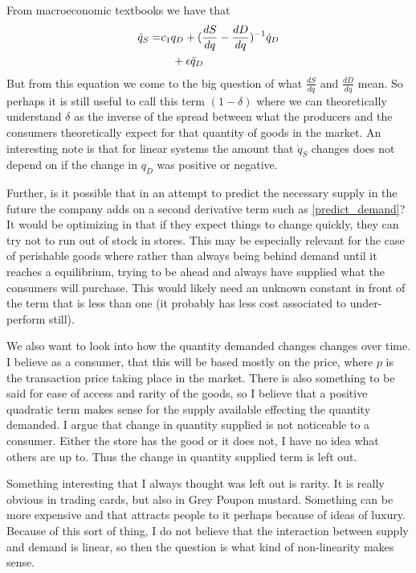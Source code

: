 \documentclass{article}
\begin{document}
From macroeconomic textbooks we have that 
\begin{align}
	\dot{q}_S = &  c_1 q_D + (\frac{dS}{dq} - \frac{dD}{dq})^{-1}\dot{q}_D \\
	& \ \ \ +\eps\ddot{q}_D %
\end{align}
But from this equation we come to the big question of what $\frac{dS}{dq}$ and $\frac{dD}{dq}$ mean. So perhaps it is still useful to call this term $(1-\delta)$ where we can theoretically understand $\delta$ as the inverse of the spread between what the producers and the consumers theoretically expect for that quantity of goods in the market. An interesting note is that for linear systems the amount that $\dot{q}_S$ changes does not depend on if the change in $q_D$ was positive or negative.

Further, is it possible that in an attempt to predict the necessary supply in the future the company adds on a second derivative term such as \eqref{predict_demand}? 
It would be optimizing in that if they expect things to change quickly, they can try not to run out of stock in stores. This may be especially relevant for the case of perishable goods where rather than always being behind demand until it reaches a equilibrium, trying to be ahead and always have supplied what the consumers will purchase. This would likely need an unknown constant in front of the term that is less than one (it probably has less cost associated to under-perform still). 

We also want to look into how the quantity demanded changes changes over time. I believe as a consumer, that this will be based mostly on the price, where $p$ is the transaction price taking place in the market. There is also something to be said for ease of access and rarity of the goods, so I believe that a positive quadratic term makes sense for the supply available effecting the quantity demanded. I argue that change in quantity supplied is not noticeable to a consumer. Either the store has the good or it does not, I have no idea what others are up to. Thus the change in quantity supplied term is left out. 

Something interesting that I always thought was left out is rarity. It is really obvious in trading cards, but also in Grey Poupon mustard. Something can be more expensive and that attracts people to it perhaps because of ideas of luxury. Because of this sort of thing, I do not believe that the interaction between supply and demand is linear, so then the question is what kind of non-linearity makes sense. 
\end{document}
